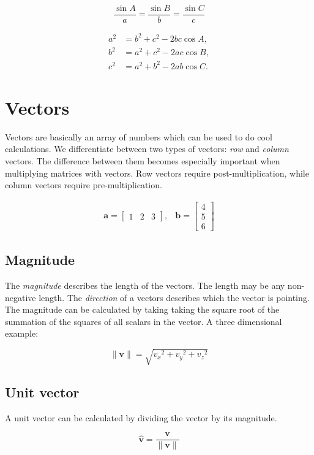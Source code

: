 \documentclass[11pt]{article}
\begin{document}
$$\frac{\sin A}{a}=\frac{\sin B}{b}=\frac{\sin C}{c}$$

\begin{align*}
a^2 &= b^2 + c^2 - 2bc\cos A, \\
b^2 &= a^2 + c^2 - 2ac\cos B, \\
c^2 &= a^2 + b^2 - 2ab\cos C.
\end{align*}


\newpage
\section{Vectors}

Vectors are basically an array of numbers which can be used to do cool calculations. We differentiate between two types of vectors: \textit{row} and \textit{column} vectors. The difference between them becomes especially important when multiplying matrices with vectors. Row vectors require post-multiplication, while column vectors require pre-multiplication.

$$
\begin{array}{cc}
\textbf{a} = \begin{bmatrix}
1 & 2 & 3
\end{bmatrix},
&
\textbf{b} = \begin{bmatrix}
4 \\ 5 \\ 6
\end{bmatrix}
\end{array}
$$

\subsection{Magnitude}

The \textit{magnitude} describes the length of the vectors. The length may be any non-negative length. The \textit{direction} of a vectors describes which the vector is pointing. The magnitude can be calculated by taking taking the square root of the summation of the squares of all scalars in the vector. A three dimensional example:

$$\|\textbf{v}\|=\sqrt{{v_x}^2+{v_y}^2+{v_z}^2}$$

\subsection{Unit vector}

A unit vector can be calculated by dividing the vector by its magnitude.

$$\hat{\textbf{v}}=\frac{\textbf{v}}{\|\textbf{v}\|}$$
\end{document}
